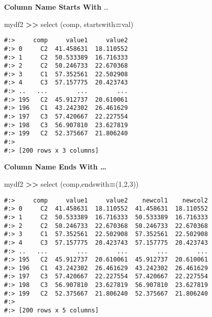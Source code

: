 \documentclass[
]{book}
\newenvironment{Shaded}{\begin{snugshade}}{\end{snugshade}}
\newcommand{\NormalTok}[1]{#1}
\newcommand{\OperatorTok}[1]{\textcolor[rgb]{0.43,0.43,0.43}{\textbf{#1}}}
\newcommand{\StringTok}[1]{\textcolor[rgb]{0.5,0.5,0.5}{#1}}
\begin{document}
\textbf{Column Name Starts With} \ldots{}

\begin{Shaded}
\begin{Highlighting}[]
\NormalTok{mydf2 }\OperatorTok{\textgreater{}\textgreater{}}\NormalTok{ select (}\StringTok{\textquotesingle{}comp\textquotesingle{}}\NormalTok{, startswith}\OperatorTok{=}\StringTok{\textquotesingle{}val\textquotesingle{}}\NormalTok{)}
\end{Highlighting}
\end{Shaded}

\begin{verbatim}
#:>     comp     value1     value2
#:> 0     C2  41.458631  18.110552
#:> 1     C2  50.533389  16.716333
#:> 2     C2  50.246733  22.670368
#:> 3     C1  57.352561  22.502908
#:> 4     C3  57.157775  20.423743
#:> ..   ...        ...        ...
#:> 195   C2  45.912737  20.610061
#:> 196   C1  43.242302  26.461629
#:> 197   C3  57.420667  22.227554
#:> 198   C3  56.907810  23.627819
#:> 199   C2  52.375667  21.806240
#:> 
#:> [200 rows x 3 columns]
\end{verbatim}

\textbf{Column Name Ends With \ldots{}}

\begin{Shaded}
\begin{Highlighting}[]
\NormalTok{mydf2 }\OperatorTok{\textgreater{}\textgreater{}}\NormalTok{ select (}\StringTok{\textquotesingle{}comp\textquotesingle{}}\NormalTok{,endswith}\OperatorTok{=}\NormalTok{(}\StringTok{\textquotesingle{}1\textquotesingle{}}\NormalTok{,}\StringTok{\textquotesingle{}2\textquotesingle{}}\NormalTok{,}\StringTok{\textquotesingle{}3\textquotesingle{}}\NormalTok{))}
\end{Highlighting}
\end{Shaded}

\begin{verbatim}
#:>     comp     value1     value2    newcol1    newcol2
#:> 0     C2  41.458631  18.110552  41.458631  18.110552
#:> 1     C2  50.533389  16.716333  50.533389  16.716333
#:> 2     C2  50.246733  22.670368  50.246733  22.670368
#:> 3     C1  57.352561  22.502908  57.352561  22.502908
#:> 4     C3  57.157775  20.423743  57.157775  20.423743
#:> ..   ...        ...        ...        ...        ...
#:> 195   C2  45.912737  20.610061  45.912737  20.610061
#:> 196   C1  43.242302  26.461629  43.242302  26.461629
#:> 197   C3  57.420667  22.227554  57.420667  22.227554
#:> 198   C3  56.907810  23.627819  56.907810  23.627819
#:> 199   C2  52.375667  21.806240  52.375667  21.806240
#:> 
#:> [200 rows x 5 columns]
\end{verbatim}
\end{document}
